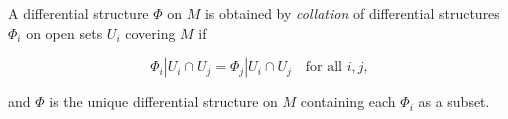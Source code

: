 A differential structure $\Phi$ on $M$ is obtained by \textit{collation} of differential structures $\Phi_i$ on open sets $U_i$ covering $M$ if

$$\Phi_i|U_i \cap U_j = \Phi_j|U_i \cap U_j \quad \text{for all } i, j,$$

and $\Phi$ is the unique differential structure on $M$ containing each $\Phi_i$ as a subset.
